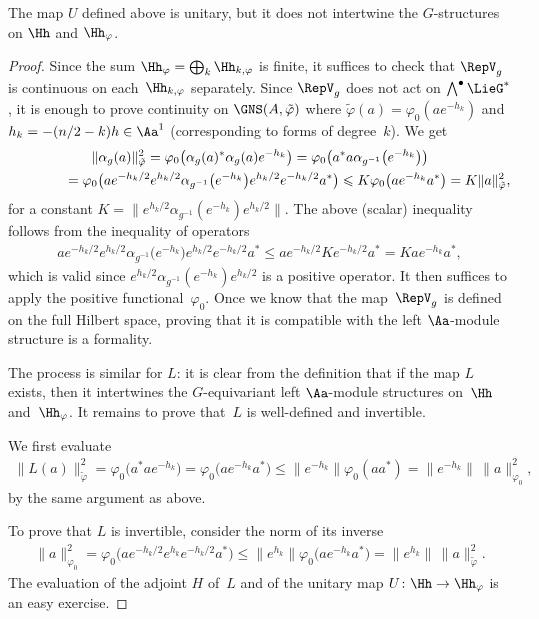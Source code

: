 \begin{Remark}
The map $U$ def\/ined above is unitary, but it does not intertwine the $G$-structures on $\Hh$ and $\Hh_\varphi$.
\end{Remark}

\begin{proof}
Since the sum $\Hh_{\varphi} = \bigoplus_k \Hh_{k, \varphi}$ is f\/inite, it suf\/f\/ices to check that $\RepV_g$ is continuous on each~$\Hh_{k, \varphi}$ separately. Since $\RepV_g$ does not act on $\bigwedge^\bullet \LieG^*$, it is enough to prove continuity on $\GNS(A, \tilde{\varphi})$ where $\tilde{\varphi}(a) = \varphi_0(a e^{-h_k})$ and $h_k = -(n/2 -k)h \in \Aa^1$ (corresponding to forms of degree~$k$). We get
\begin{gather*}
\| \alpha_g(a) \|_{\tilde{\varphi}}^2 = \varphi_0\big( \alpha_g(a)^* \alpha_g(a) e^{-h_k} \big) = \varphi_0\big( a^* a \alpha_{g^{-1}}\big(e^{-h_k}\big) \big) \\
\hphantom{\| \alpha_g(a) \|_{\tilde{\varphi}}^2}{}
= \varphi_0\big( a e^{-h_k/2} e^{h_k/2}\alpha_{g^{-1}}\big(e^{-h_k}\big)e^{h_k/2} e^{-h_k/2} a^*\big) \leqslant K \varphi_0\big( a e^{-h_k}a^*\big) = K \| a \|_{\tilde{\varphi}}^2,
\end{gather*}
for a constant $K = \| e^{h_k/2}\alpha_{g^{-1}}(e^{-h_k})e^{h_k/2} \|$. The above (scalar) inequality follows from the inequality of operators
\begin{gather*}
a e^{-h_k/2} e^{h_k/2}\alpha_{g^{-1}}\big(e^{-h_k}\big)e^{h_k/2} e^{-h_k/2} a^* \leqslant a e^{-h_k/2} K e^{-h_k/2} a^* = K a e^{-h_k} a^*,
\end{gather*}
which is valid since $e^{h_k/2}\alpha_{g^{-1}}(e^{-h_k})e^{h_k/2}$ is a positive operator. It then suf\/f\/ices to apply the positive functional~$\varphi_0$. Once we know that the map~$\RepV_g$ is def\/ined on the full Hilbert space, proving that it is compatible with the left $\Aa$-module structure is a formality.

The process is similar for $L$: it is clear from the def\/inition that if the map $L$ exists, then it intertwines the $G$-equivariant left $\Aa$-module structures on~$\Hh$ and~$\Hh_\varphi$. It remains to prove that~$L$ is well-def\/ined and invertible.

We f\/irst evaluate
\begin{gather*}
\| L( a) \|_{\tilde{\varphi}}^2 = \varphi_0\big( a^* a e^{-h_k}\big) = \varphi_0\big( a e^{-h_k} a^*\big) \leqslant \big\| e^{-h_k} \big\| \varphi_0(a a^*) = \big\| e^{-h_k} \big\| \, \| a \|_{\varphi_0}^2,
\end{gather*}
by the same argument as above.

To prove that $L$ is invertible, consider the norm of its inverse
\begin{gather*}
\| a \|_{\varphi_0}^2 = \varphi_0\big( a e^{-h_k/2} e^{h_k} e^{-h_k/2} a^*\big) \leqslant \big\| e^{h_k} \big\| \varphi_0\big( a e^{-h_k} a^*\big) = \big\|e^{h_k} \big\| \, \| a \|_{\tilde{\varphi}}^2.
\end{gather*}
The evaluation of the adjoint $H$ of~$L$ and of the unitary map $U \colon \Hh \to \Hh_\varphi$ is an easy exercise.
\end{proof}

